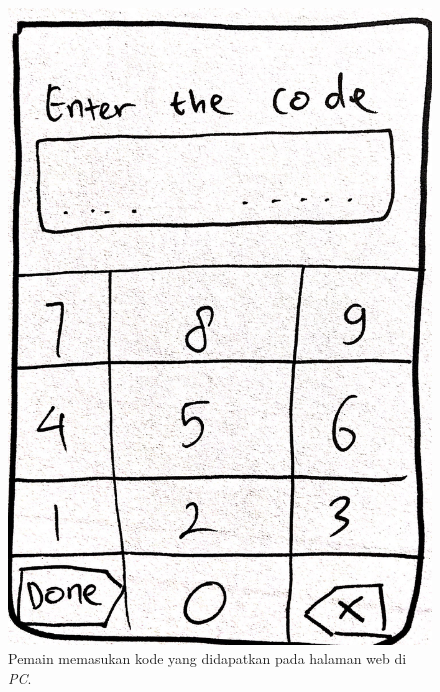 \documentclass[a4paper,twoside]{article}
\begin{document}
\begin{enumerate}
		\begin{figure}[H]
			\centering
			\includegraphics[scale=0.1]{Gambar/mob2_home2}
			\caption{Pemain memasukan kode yang didapatkan pada halaman web di \textit{PC}.}
			\label{fig:11_mob2_home2}
		\end{figure}
	

\end{enumerate}
\end{document}
